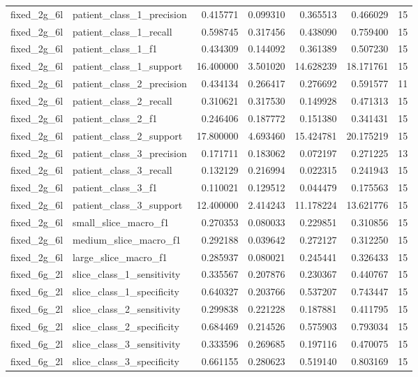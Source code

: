 \begin{tabular}{llrrrrr}
fixed_2g_6l & patient_class_1_precision & 0.415771 & 0.099310 & 0.365513 & 0.466029 & 15 \\
fixed_2g_6l & patient_class_1_recall & 0.598745 & 0.317456 & 0.438090 & 0.759400 & 15 \\
fixed_2g_6l & patient_class_1_f1 & 0.434309 & 0.144092 & 0.361389 & 0.507230 & 15 \\
fixed_2g_6l & patient_class_1_support & 16.400000 & 3.501020 & 14.628239 & 18.171761 & 15 \\
fixed_2g_6l & patient_class_2_precision & 0.434134 & 0.266417 & 0.276692 & 0.591577 & 11 \\
fixed_2g_6l & patient_class_2_recall & 0.310621 & 0.317530 & 0.149928 & 0.471313 & 15 \\
fixed_2g_6l & patient_class_2_f1 & 0.246406 & 0.187772 & 0.151380 & 0.341431 & 15 \\
fixed_2g_6l & patient_class_2_support & 17.800000 & 4.693460 & 15.424781 & 20.175219 & 15 \\
fixed_2g_6l & patient_class_3_precision & 0.171711 & 0.183062 & 0.072197 & 0.271225 & 13 \\
fixed_2g_6l & patient_class_3_recall & 0.132129 & 0.216994 & 0.022315 & 0.241943 & 15 \\
fixed_2g_6l & patient_class_3_f1 & 0.110021 & 0.129512 & 0.044479 & 0.175563 & 15 \\
fixed_2g_6l & patient_class_3_support & 12.400000 & 2.414243 & 11.178224 & 13.621776 & 15 \\
fixed_2g_6l & small_slice_macro_f1 & 0.270353 & 0.080033 & 0.229851 & 0.310856 & 15 \\
fixed_2g_6l & medium_slice_macro_f1 & 0.292188 & 0.039642 & 0.272127 & 0.312250 & 15 \\
fixed_2g_6l & large_slice_macro_f1 & 0.285937 & 0.080021 & 0.245441 & 0.326433 & 15 \\
fixed_6g_2l & slice_class_1_sensitivity & 0.335567 & 0.207876 & 0.230367 & 0.440767 & 15 \\
fixed_6g_2l & slice_class_1_specificity & 0.640327 & 0.203766 & 0.537207 & 0.743447 & 15 \\
fixed_6g_2l & slice_class_2_sensitivity & 0.299838 & 0.221228 & 0.187881 & 0.411795 & 15 \\
fixed_6g_2l & slice_class_2_specificity & 0.684469 & 0.214526 & 0.575903 & 0.793034 & 15 \\
fixed_6g_2l & slice_class_3_sensitivity & 0.333596 & 0.269685 & 0.197116 & 0.470075 & 15 \\
fixed_6g_2l & slice_class_3_specificity & 0.661155 & 0.280623 & 0.519140 & 0.803169 & 15 \\

\end{tabular}

